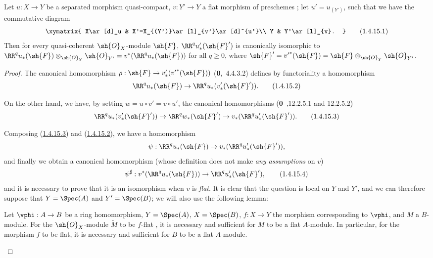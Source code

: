 \begin{proposition}[1.4.15]
\label{III.1.4.15}
Let $u:X\to Y$ be a separated morphism quasi-compact, $v:Y'\to Y$ a flat morphism of preschemes ; let $u'=u_{(Y')}$, such that we have the commutative diagram
\[
  \xymatrix{
    X\ar[d]_u &
    X'=X_{(Y')}\ar[l]_{v'}\ar[d]^{u'}\\
    Y &
    Y'\ar[l]_{v}.
  }
  \tag{1.4.15.1}
  \label{III.1.4.15.1}
\]
Then for every quasi-coherent $\sh{O}_X$-module $\sh{F}$, $\RR^q u_*'(\sh{F}')$ is canonically isomorphic to $\RR^q u_*(\sh{F})\otimes_{\sh{O}_Y}\sh{O}_{Y'}=v^*(\RR^q u_*(\sh{F}))$ for all $q\geq 0$, where $\sh{F}'={v'}^*(\sh{F})=\sh{F}\otimes_{\sh{O}_Y}\sh{O}_{Y'}$.
\end{proposition}

\begin{proof}
The canonical homomorphism $\rho:\sh{F}\to v_*'({v'}^*(\sh{F}))$ (\textbf{0},~4.4.3.2) defines by functoriality a homomorphism
\[
  \RR^q u_*(\sh{F})\to\RR^q u_*(v_*'(\sh{F}')).
  \tag{1.4.15.2}\label{III.1.4.15.2}
\]

On the other hand, we have, by setting $w=u\circ v'=v\circ u'$, the canonical homomorphisms (\textbf{0}~,12.2.5.1 and 12.2.5.2)
\[
  \RR^q u_*(v_*'(\sh{F}'))\to\RR^q w_*(\sh{F}')\to v_*(\RR^q u_*'(\sh{F}')).
  \tag{1.4.15.3}\label{III.1.4.15.3}
\]

Composing (\hyperref[III.1.4.15.3]{1.4.15.3}) and (\hyperref[III.1.4.15.2]{1.4.15.2}), we have a homomorphism
\[
  \psi:\RR^q u_*(\sh{F})\to v_*(\RR^q u_*'(\sh{F}')),
\]
and finally we obtain a canonical homomorphism (whose definition does not make \emph{any assumptions} on $v$)
\[
  \psi^\sharp:v^*(\RR^q u_*(\sh{F}))\to\RR^q u_*'(\sh{F}'),
  \tag{1.4.15.4}
\]
and it is necessary to prove that it is an isomorphism when $v$ is \emph{flat}.
It is clear that the question is local on $Y$ and $Y'$, and we can therefore suppose that $Y=\Spec(A)$ and $Y'=\Spec(B)$; we will also use the following lemma:
\begin{lemma}[1.4.15.5]
\label{III.1.4.15.5}
Let $\vphi:A\to B$ be a ring homomorphism, $Y=\Spec(A)$, $X=\Spec(B)$, $f:X\to Y$ the morphism corresponding to $\vphi$, and $M$ a $B$-module.
For the $\sh{O}_X$-module $\widetilde{M}$ to be $f$-flat , it is necessary and sufficient for $M$ to be a flat $A$-module.
In particular, for the morphism $f$ to be flat, it is necessary and sufficient for $B$ to be a flat $A$-module.
\end{lemma}


\end{proof}

